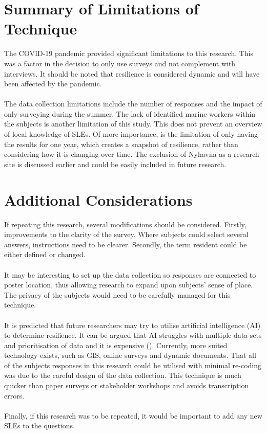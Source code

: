 \paragraph{}


\section{Summary of Limitations of Technique}
The COVID-19 pandemic provided significant limitations to this research. This was a factor in the decision to only use surveys and not complement with interviews. It should be noted that resilience is considered dynamic and will have been affected by the pandemic. 
\paragraph{}
The data collection limitations include the number of responses and the impact of only surveying during the summer. The lack of identified marine workers within the subjects is another limitation of this study. This does not prevent an overview of local knowledge of SLEs. Of more importance, is the limitation of only having the results for one year, which creates a snapshot of resilience, rather than considering how it is changing over time. The exclusion of Nyhavna as a research site is discussed earlier and could be easily included in future research. 


\section{Additional Considerations}
If repeating this research, several modifications should be considered. Firstly, improvements to the clarity of the survey. Where subjects could select several answers, instructions need to be clearer. Secondly, the term resident could be either defined or changed. 
\paragraph{}
It may be interesting to set up the data collection so responses are connected to poster location, thus allowing research to expand upon subjects' sense of place. The privacy of the subjects would need to be carefully managed for this technique. 
\paragraph{}
It is predicted that future researchers may try to utilise artificial intelligence (AI) to determine resilience. It can be argued that AI struggles with multiple data-sets and prioritisation of data and it is expensive (\cite{shane_you_2019}). Currently, more suited technology exists, such as GIS, online surveys and dynamic documents. That all of the subjects responses in this research could be utilised with minimal re-coding was due to the careful design of the data collection. This technique is much quicker than paper surveys or stakeholder workshops and avoids transcription errors.
\paragraph{}
Finally, if this research was to be repeated, it would be important to add any new SLEs to the questions. 



